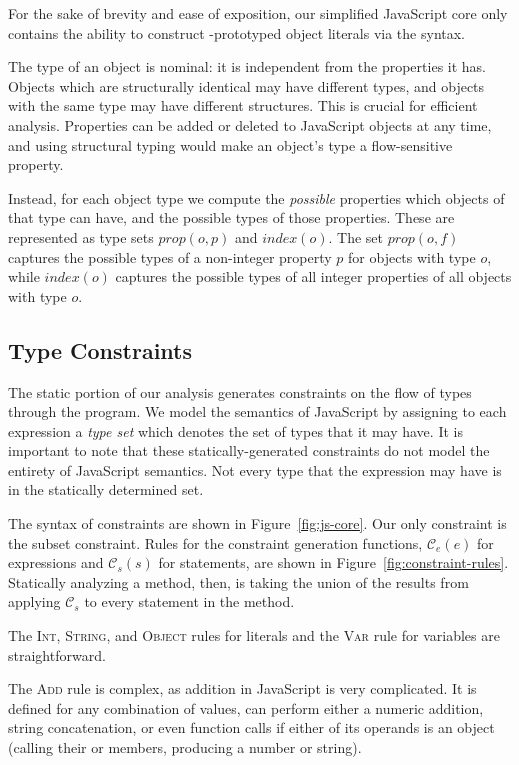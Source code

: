 For the sake of brevity and ease of exposition, our simplified JavaScript core
only contains the ability to construct -prototyped object
literals via the \code{\{\}} syntax.

The type of an object is nominal: it is independent from the properties it
has. Objects which are structurally identical may have different types, and
objects with the same type may have different structures. This is crucial for
efficient analysis. Properties can be added or deleted to JavaScript objects
at any time, and using structural typing would make an object's type a
flow-sensitive property.

Instead, for each object type we compute the {\it possible} properties which
objects of that type can have, and the possible types of those properties.
These are represented as type sets $\mathit{prop}(o,p)$ and
$\mathit{index}(o)$. The set $\mathit{prop}(o,f)$ captures the possible types
of a non-integer property $p$ for objects with type $o$, while
$\mathit{index}(o)$ captures the possible types of all integer properties of
all objects with type $o$.

\subsection{Type Constraints}
\label{sec:constraints}

The static portion of our analysis generates constraints on the flow of types
through the program. We model the semantics of JavaScript by assigning to each
expression a \emph{type set} which denotes the set of types that it may
have. It is important to note that these statically-generated constraints do
not model the entirety of JavaScript semantics. Not every type that the
expression may have is in the statically determined set.

The syntax of constraints are shown in Figure~\ref{fig:js-core}. Our only
constraint is the subset constraint. Rules for the constraint generation
functions, $\mathcal{C}_e(e)$ for expressions and $\mathcal{C}_s(s)$ for
statements, are shown in Figure~\ref{fig:constraint-rules}. Statically
analyzing a method, then, is taking the union of the results from applying
$\mathcal{C}_s$ to every statement in the method.

The \textsc{Int}, \textsc{String}, and \textsc{Object} rules for literals and
the \textsc{Var} rule for variables are straightforward.

The \textsc{Add} rule is complex, as addition in JavaScript is very complicated. It is
defined for any combination of values, can perform either a numeric addition,
string concatenation, or even function calls if either of its operands is an
object (calling their  or  members, producing a
number or string).

